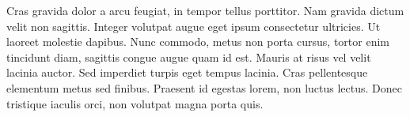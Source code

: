 \documentclass{article}
\begin{document}
Cras gravida dolor a arcu feugiat, in tempor tellus porttitor. Nam gravida dictum velit non sagittis. Integer volutpat augue eget ipsum consectetur ultricies. Ut laoreet molestie dapibus. Nunc commodo, metus non porta cursus, tortor enim tincidunt diam, sagittis congue augue quam id est. Mauris at risus vel velit lacinia auctor. Sed imperdiet turpis eget tempus lacinia. Cras pellentesque elementum metus sed finibus. Praesent id egestas lorem, non luctus lectus. Donec tristique iaculis orci, non volutpat magna porta quis.
\end{document}
